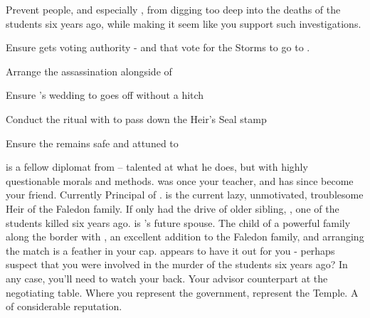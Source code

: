 \documentclass[char]{GL2020}
\begin{document}
\begin{itemz}[Goals]
	\item Prevent people, and especially \cHeir{}, from digging too deep into the deaths of the students six years ago, while making it seem like you support such investigations.
	\item Ensure \cHeir{} gets voting authority - and that \cHeir{\they} vote\cHeir{\plural} for the Storms to go to \pShip{}.
	\item Arrange the assassination \cLoud{} alongside of \cEvil{}
	\item Ensure \cHeir{}’s wedding to \cChupStudent{} goes off without a hitch
	\item Conduct the ritual with \cHeir{} to pass down the Heir’s Seal stamp
	\item Ensure the \iMirror{} remains safe and attuned to \pTech{} 
\end{itemz}

\begin{itemz}[Notes]
	\item 
\end{itemz}

\begin{contacts}
	\contact{\cEvil{}} is a fellow diplomat from \pFarm{} -- talented at what he does, but with highly questionable morals and methods.
	\cPrincipal{} was once your teacher, and has since become your friend.  Currently Principal of \pSc{}.
\contact{\cHeir{}} is the current lazy, unmotivated, troublesome Heir of the Faledon family. If only \cHeir{\they} had the drive of \cHeir{\their} older sibling, \cHeirSibling{}, one of the students killed six years ago.
\contact{\cChupStudent{}} is \cHeir{}’s future spouse. The child of a powerful \pFarm{} family along the border with \pTech{}, \cChupStudent{\they} \cChupStudent{\are} an excellent addition to the Faledon family, and arranging the match is a feather in your cap.
\contact{\cChupAvenger{}} appears to have it out for you - perhaps \cChupAvenger{\they} suspect\cChupAvenger{\plural} that you were involved in the murder of the students six years ago?  In any case, you’ll need to watch your back.
	\contact{\cAntiChup{}} Your advisor counterpart at the negotiating table. Where you represent the government, \cAntiChup{\they} represent\cAntiChup{\plural} the Temple. A \cAntiChup{\clergy} of considerable reputation.
	
\end{contacts}
\end{document}
